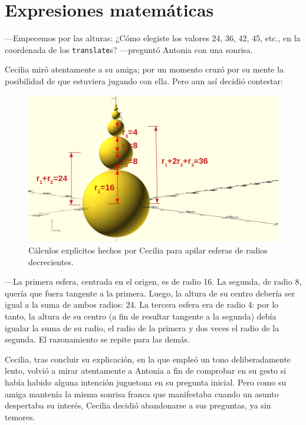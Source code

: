 \section{Expresiones matemáticas}

---Empecemos por las alturas: ¿Cómo elegiste los valores 24, 36, 42,
45, etc., en la coordenada  de los \lstinline!translate!s?
---pre\-gun\-tó Antonia con una sonrisa.

Cecilia miró atentamente a su amiga; por un momento cruzó por su mente
la posibilidad de que estuviera jugando con ella. Pero aun así decidió
contestar:


 \begin{figure}[ht]
   \centering
   \includegraphics[width=.85\textwidth]{imagenes/esferas-anotadas}   
   \caption{Cálculos explícitos hechos por Cecilia para apilar esferas
     de radios decrecientes.}
   \label{fig:esferas-anotadas}
 \end{figure}


 ---La primera esfera, centrada en el origen, es de radio 16. La
 segunda, de radio 8, quería que fuera tangente a la primera. Luego,
 la altura de su centro debería ser igual a la suma de ambos radios:
 24. La tercera esfera era de radio 4: por lo tanto, la altura de su
 centro (a fin de resultar tangente a la segunda) debía igualar la
 suma de su radio, el radio de la primera y dos veces el radio de la
 segunda. El razonamiento se repite para las demás.

 Cecilia, tras concluir su explicación, en la que empleó un tono
 deliberadamente lento, volvió a mirar atentamente a Antonia a fin de
 comprobar en su gesto si había habido alguna intención juguetona en
 su pregunta inicial. Pero como su amiga mantenía la misma sonrisa
 franca que manifestaba cuando un asunto despertaba su interés,
 Cecilia decidió abandonarse a sus preguntas, ya sin temores.

